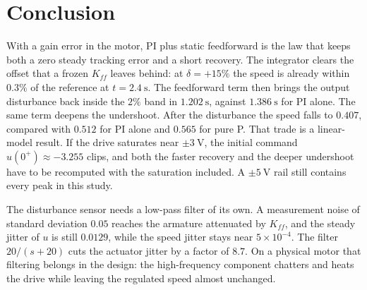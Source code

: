 \documentclass[12pt,a4paper]{article}
\begin{document}
\section{Conclusion}

With a gain error in the motor, PI plus static feedforward is the law that keeps both a zero steady tracking error and a short recovery.
The integrator clears the offset that a frozen \(K_{ff}\) leaves behind: at \(\delta=+15\%\) the speed is already within \(0.3\%\) of the reference at \(t=2.4~\mathrm{s}\).
The feedforward term then brings the output disturbance back inside the \(2\%\) band in \(1.202~\mathrm{s}\), against \(1.386~\mathrm{s}\) for PI alone.
The same term deepens the undershoot. After the disturbance the speed falls to \(0.407\), compared with \(0.512\) for PI alone and \(0.565\) for pure P.
That trade is a linear-model result. If the drive saturates near \(\pm 3~\mathrm{V}\), the initial command \(u(0^+)\approx -3.255\) clips, and both the faster recovery and the deeper undershoot have to be recomputed with the saturation included. A \(\pm 5~\mathrm{V}\) rail still contains every peak in this study.

The disturbance sensor needs a low-pass filter of its own.
A measurement noise of standard deviation \(0.05\) reaches the armature attenuated by \(K_{ff}\), and the steady jitter of \(u\) is still \(0.0129\), while the speed jitter stays near \(5\times 10^{-4}\).
The filter \(20/(s+20)\) cuts the actuator jitter by a factor of \(8.7\).
On a physical motor that filtering belongs in the design: the high-frequency component chatters and heats the drive while leaving the regulated speed almost unchanged.
\end{document}
